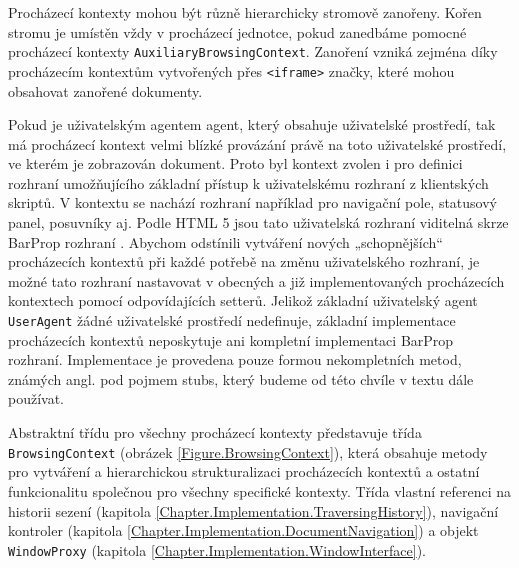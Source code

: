 Procházecí kontexty mohou být různě hierarchicky stromově zanořeny. Kořen stromu je umístěn vždy v procházecí jednotce, pokud zanedbáme pomocné procházecí kontexty \texttt{AuxiliaryBrowsingContext}. Zanoření vzniká zejména díky procházecím kontextům vytvořených přes \texttt{<iframe>} značky, které mohou obsahovat zanořené dokumenty.

Pokud je uživatelským agentem agent, který obsahuje uživatelské prostředí, tak má procházecí kontext velmi blízké provázání právě na toto uživatelské prostředí, ve kterém je zobrazován dokument. Proto byl kontext zvolen i pro definici rozhraní umožňujícího základní přístup k uživatelskému rozhraní z klientských skriptů. V kontextu se nachází rozhraní například pro navigační pole, statusový panel, posuvníky aj. Podle HTML 5 jsou tato uživatelská rozhraní viditelná skrze BarProp rozhraní . Abychom odstínili vytváření nových „schopnějších“ procházecích kontextů při každé potřebě na změnu uživatelského rozhraní, je možné tato rozhraní nastavovat v obecných a již implementovaných procházecích kontextech pomocí odpovídajících setterů. Jelikož základní uživatelský agent \texttt{UserAgent} žádné uživatelské prostředí nedefinuje, základní implementace procházecích kontextů neposkytuje ani kompletní implementaci BarProp rozhraní. Implementace je provedena pouze formou nekompletních metod, známých angl. pod pojmem stubs, který budeme od této chvíle v textu dále používat.

Abstraktní třídu pro všechny procházecí kontexty představuje třída \texttt{BrowsingContext} (obrázek \ref{Figure.BrowsingContext}), která obsahuje metody pro vytváření a hierarchickou strukturalizaci procházecích kontextů a ostatní funkcionalitu společnou pro všechny specifické kontexty. Třída vlastní referenci na historii sezení (kapitola \ref{Chapter.Implementation.TraversingHistory}), navigační kontroler (kapitola \ref{Chapter.Implementation.DocumentNavigation}) a objekt \texttt{WindowProxy} (kapitola \ref{Chapter.Implementation.WindowInterface}).

